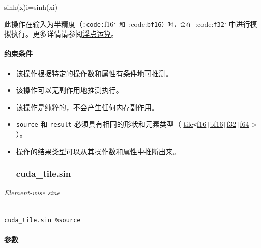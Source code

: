 \documentclass{article}
\begin{document}
sinh(x)i=sinh(xi)


此操作在输入为半精度（\texttt{:code:}f16`\texttt{ 和 }:code:\texttt{bf16}\texttt{）时，会在 }:code:\texttt{f32}` 中进行模拟执行。更多详情请参阅\href{https://docs.nvidia.com/cuda/tile-ir/latest/sections/operations.html#op-group-floating-point}{浮点运算}。





\paragraph{约束条件}


\begin{itemize}
\item 该操作根据特定的操作数和属性有条件地可推测。
\item 该操作可以无副作用地推测执行。
\item 该操作是纯粹的，不会产生任何内存副作用。
\item \texttt{source} 和 \texttt{result} 必须具有相同的形状和元素类型（ \href{https://docs.nvidia.com/cuda/tile-ir/latest/sections/types.html#type-tile}{tile}\texttt{<}\href{https://docs.nvidia.com/cuda/tile-ir/latest/sections/types.html#subsection-element-types}{f16}\texttt{|}\href{https://docs.nvidia.com/cuda/tile-ir/latest/sections/types.html#subsection-element-types}{bf16}\texttt{|}\href{https://docs.nvidia.com/cuda/tile-ir/latest/sections/types.html#subsection-element-types}{f32}\texttt{|}\href{https://docs.nvidia.com/cuda/tile-ir/latest/sections/types.html#subsection-element-types}{f64} > ）。
\item 操作的结果类型可以从其操作数和属性中推断出来。




\subsubsection{cuda\_tile.sin}


\end{itemize}
\textit{Element-wise sine}




\begin{lstlisting}

cuda_tile.sin %source

\end{lstlisting}



\paragraph{参数}
\end{document}
